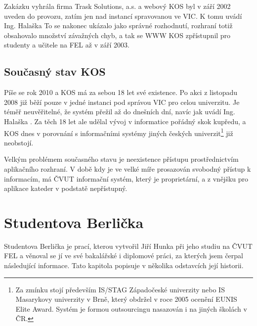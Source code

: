 \documentclass[11pt,twoside,a4paper]{book}
\begin{document}
Zakázku vyhrála firma Trask Solutions, a.s. a webový KOS byl v září 2002 uveden do provozu, zatím jen nad instancí spravovanou ve VIC. K tomu uvádí Ing. Halaška\cite{student:komentar-ke-kos} \textit{} To se nakonec ukázalo jako správné rozhodnutí, rozhraní totiž obsahovalo množství závažných chyb, a tak se WWW KOS zpřístupnil pro studenty a učitele na FEL až v září 2003\cite{student:kos-na-web}.

\subsection{Současný stav KOS}
Píše se rok 2010 a KOS má za sebou 18 let své existence. Po akci  z listopadu 2008\cite{sik} již běží pouze v jedné instanci pod správou VIC pro celou univerzitu. Je téměř neuvěřitelné, že systém přežil až do dnešních dní, navíc jak uvádí Ing. Halaška\cite{student:komentar-ke-kos} \textit{}. Za těch 18 let ale udělal vývoj v informatice pořádný skok kupředu, a KOS dnes v porovnání s informačními systémy jiných českých univerzit\footnote{Za zmínku stojí především IS/STAG Západočeské univerzity nebo IS Masarykovy univerzity v Brně, který obdržel v roce 2005 ocenění EUNIS Elite Award. Systém je formou outsourcingu nasazován i na jiných školách v ČR. } již neobstojí.

Velkým problémem současného stavu je neexistence přístupu prostřednictvím aplikačního rozhraní. V době kdy je ve velké míře prosazován svobodný přístup k informacím, má ČVUT informační systém, který je proprietární, a z vnějšku pro aplikace kateder v podstatě nepřístupný.


\section{Studentova Berlička}

Studentova Berlička je prací, kterou vytvořil Jiří Hunka při jeho studiu na ČVUT FEL a věnoval se jí ve své bakalářské\cite{hunka:bp} i diplomové\cite{hunka:dp} práci, za kterých jsem čerpal následující informace. Tato kapitola popisuje v několika odstavcích její historii.
\end{document}
